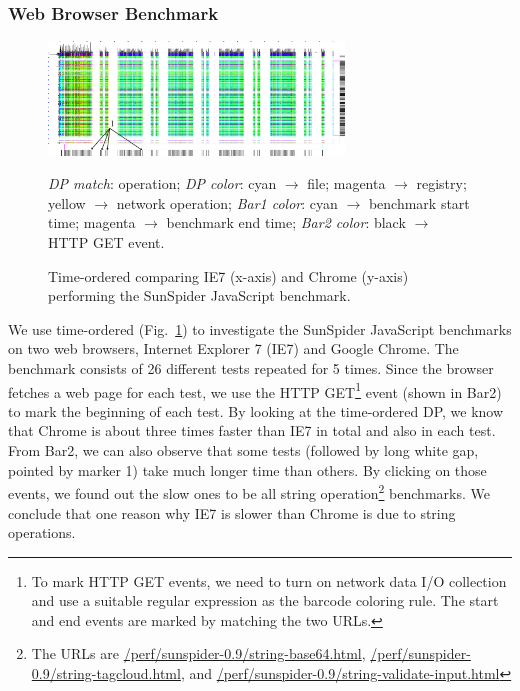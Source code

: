 \subsubsection{Web Browser Benchmark}
\label{sec:wbbench}

\begin{figure}[htb]
\begin{center}
\includegraphics[width=0.7\textwidth]{dep-wbbench-dp.png}
\end{center}
\caption{Time-ordered \VDP{} comparing IE7 (x-axis) and Chrome (y-axis)
performing the
SunSpider JavaScript benchmark.
}
\label{fig:wbbench-dp}
{\it DP match}: operation;
{\it DP color}: cyan $\rightarrow$ file; magenta $\rightarrow$ registry;
yellow $\rightarrow$ network operation;
{\it Bar1 color}: cyan $\rightarrow$ benchmark start time;
magenta $\rightarrow$ benchmark end time;
{\it Bar2 color}: black $\rightarrow$ HTTP GET event.
\end{figure}

We use time-ordered \VDP{} (Fig.~\ref{fig:wbbench-dp}) to investigate the
SunSpider JavaScript benchmarks on
two web browsers, Internet Explorer 7 (IE7) and Google Chrome.
The benchmark consists of 26 different tests repeated for 5 times.
Since the browser fetches a web page for each test,
we use the HTTP GET\footnote{
To mark HTTP GET events, we need to turn on network data I/O collection
and use a suitable regular expression as the barcode coloring rule.
The start and end events are marked by matching the two URLs.
}
event (shown in Bar2) to mark the beginning
of each test.
By looking at the time-ordered DP, we know that Chrome is about three
times faster than IE7 in total and also in each test.
From Bar2,
we can also observe that some tests (followed by long white gap,
pointed by marker 1) take much longer time than others.
By clicking on those events, we found out the slow ones to be all string
operation\footnote{
The URLs are \url{/perf/sunspider-0.9/string-base64.html},
\url{/perf/sunspider-0.9/string-tagcloud.html},
and \url{/perf/sunspider-0.9/string-validate-input.html}}
benchmarks.
We conclude that one reason why IE7 is slower than Chrome is due to string operations.
